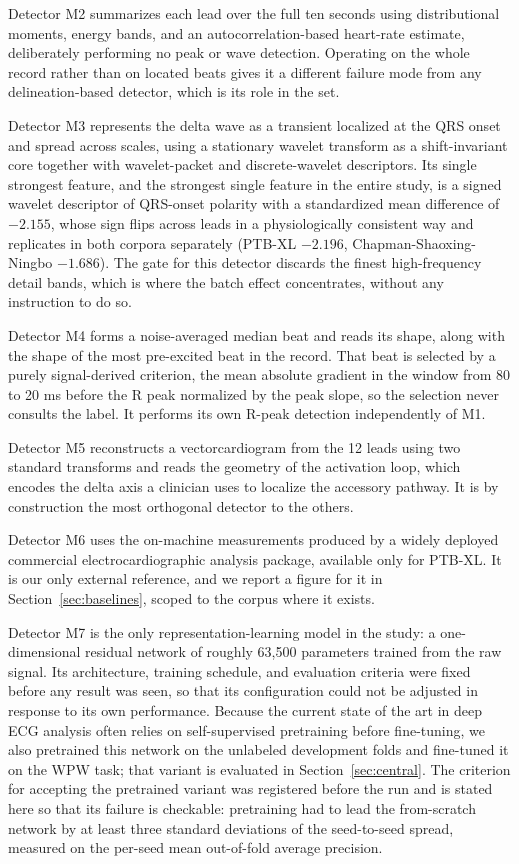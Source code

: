 \documentclass[11pt]{article}
\begin{document}
Detector M2 summarizes each lead over the full ten seconds using distributional moments, energy bands, and an autocorrelation-based heart-rate estimate, deliberately performing no peak or wave detection. Operating on the whole record rather than on located beats gives it a different failure mode from any delineation-based detector, which is its role in the set.

Detector M3 represents the delta wave as a transient localized at the QRS onset and spread across scales, using a stationary wavelet transform as a shift-invariant core together with wavelet-packet and discrete-wavelet descriptors. Its single strongest feature, and the strongest single feature in the entire study, is a signed wavelet descriptor of QRS-onset polarity with a standardized mean difference of $-2.155$, whose sign flips across leads in a physiologically consistent way and replicates in both corpora separately (PTB-XL $-2.196$, Chapman-Shaoxing-Ningbo $-1.686$). The gate for this detector discards the finest high-frequency detail bands, which is where the batch effect concentrates, without any instruction to do so.

Detector M4 forms a noise-averaged median beat and reads its shape, along with the shape of the most pre-excited beat in the record. That beat is selected by a purely signal-derived criterion, the mean absolute gradient in the window from 80 to 20 ms before the R peak normalized by the peak slope, so the selection never consults the label. It performs its own R-peak detection independently of M1.

Detector M5 reconstructs a vectorcardiogram from the 12 leads using two standard transforms and reads the geometry of the activation loop, which encodes the delta axis a clinician uses to localize the accessory pathway. It is by construction the most orthogonal detector to the others.

Detector M6 uses the on-machine measurements produced by a widely deployed commercial electrocardiographic analysis package, available only for PTB-XL. It is our only external reference, and we report a figure for it in Section~\ref{sec:baselines}, scoped to the corpus where it exists.

Detector M7 is the only representation-learning model in the study: a one-dimensional residual network of roughly 63{,}500 parameters trained from the raw signal. Its architecture, training schedule, and evaluation criteria were fixed before any result was seen, so that its configuration could not be adjusted in response to its own performance. Because the current state of the art in deep ECG analysis often relies on self-supervised pretraining before fine-tuning, we also pretrained this network on the unlabeled development folds and fine-tuned it on the WPW task; that variant is evaluated in Section~\ref{sec:central}. The criterion for accepting the pretrained variant was registered before the run and is stated here so that its failure is checkable: pretraining had to lead the from-scratch network by at least three standard deviations of the seed-to-seed spread, measured on the per-seed mean out-of-fold average precision.
\label{sec:m7gate}
\end{document}
